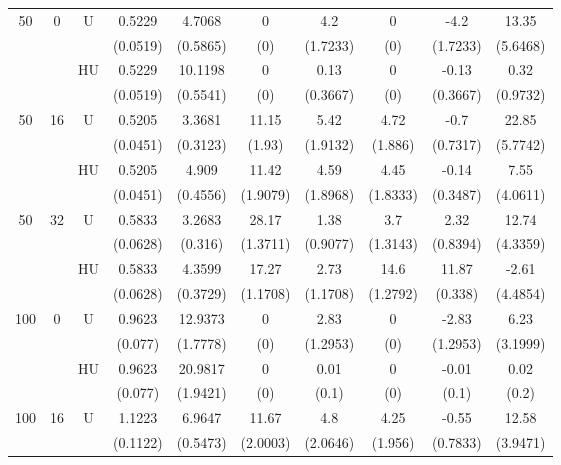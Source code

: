 \documentclass[11pt,a4paper]{article}
\begin{document}
\begin{table}[h!]
\begin{tabular}{|c|c|c|c|c|c|c|c|c|c|}
50 & 0 & U&0.5229 & 4.7068 & 0 & 4.2 & 0 & -4.2 & 13.35  \\
& & & (0.0519) & (0.5865) & (0) & (1.7233) & (0) & (1.7233) & (5.6468) \\
 &  & HU &0.5229 & 10.1198 & 0 & 0.13 & 0 & -0.13 & 0.32  \\
& & & (0.0519) & (0.5541) & (0) & (0.3667) & (0) & (0.3667) & (0.9732) \\
\hline %
50 & 16 & U&0.5205 & 3.3681 & 11.15 & 5.42 & 4.72 & -0.7 & 22.85  \\	
& & & (0.0451) & (0.3123) & (1.93) & (1.9132) & (1.886) & (0.7317) & (5.7742) \\
 &  &HU &0.5205 & 4.909 & 11.42 & 4.59 & 4.45 & -0.14 & 7.55  \\
& & & (0.0451) & (0.4556) & (1.9079) & (1.8968) & (1.8333) & (0.3487) & (4.0611) \\
\hline %
50 & 32 & U& 0.5833 & 3.2683 & 28.17 & 1.38 & 3.7 & 2.32 & 12.74  \\
& & & (0.0628) & (0.316) & (1.3711) & (0.9077) & (1.3143) & (0.8394) & (4.3359) \\
 &  &HU &0.5833 & 4.3599 & 17.27 & 2.73 & 14.6 & 11.87 & -2.61  \\
& & & (0.0628) & (0.3729) & (1.1708) & (1.1708) & (1.2792) & (0.338) & (4.4854) \\
\hline
\hline %
100 & 0 & U& 0.9623 & 12.9373 & 0 & 2.83 & 0 & -2.83 & 6.23  \\
& & & (0.077) & (1.7778) & (0) & (1.2953) & (0) & (1.2953) & (3.1999) \\
 &  &HU & 0.9623 & 20.9817 & 0 & 0.01 & 0 & -0.01 & 0.02  \\
& & & (0.077) & (1.9421) & (0) & (0.1) & (0) & (0.1) & (0.2) \\
\hline %
100 & 16 & U& 1.1223 & 6.9647 & 11.67 & 4.8 & 4.25 & -0.55 & 12.58  \\
& & & (0.1122) & (0.5473) & (2.0003) & (2.0646) & (1.956) & (0.7833) & (3.9471) \\

\end{tabular}
\end{table}
\end{document}
